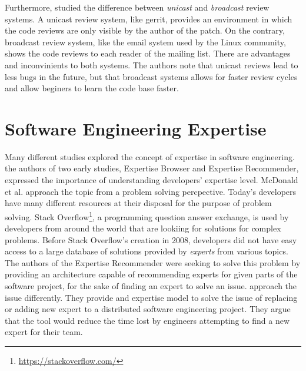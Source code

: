 Furthermore, \citep{armstrong} studied the difference between \textit{unicast} and \textit{broadcast} review systems. A unicast review system, like gerrit, provides an environment in which the code reviews are only visible by the author of the patch. On the contrary, broadcast review system, like the email system used by the Linux community, shows the code reviews to each reader of the mailing list. There are advantages and inconvinients to both systems. The authors note that unicast reviews lead to less bugs in the future, but that broadcast systems allows for faster review cycles and allow beginers to learn the code base faster. 



\section{Software Engineering Expertise}
\label{sec:expertise_models}

Many different studies explored the concept of expertise in software engineering. the authors of two early studies, Expertise Browser \citep{mockus02} and Expertise Recommender\citep{McDonald}, expressed the importance of understanding developers' expertise level. McDonald et al. approach the topic from a problem solving percpective. Today's developers have many different resources at their disposal for the purpose of problem solving. Stack Overflow\footnote{\url{https://stackoverflow.com/}}, a programming question answer exchange, is used by developers from around the world that are lookiing for solutions for complex problems. Before Stack Overflow's creation in 2008, developers did not have easy access to a large database of solutions provided by \textit{experts} from various topics. The authors of the Expertise Recommender were seeking to solve this problem by providing an architecture capable of recommending experts for given parts of the software project, for the sake of finding an expert to solve an issue. \citep{mockus02} approach the issue differently. They provide and expertise model to solve the issue of replacing or adding new expert to a distributed software engineering project. They argue that the tool would reduce the time lost by engineers attempting to find a new expert for their team. 


